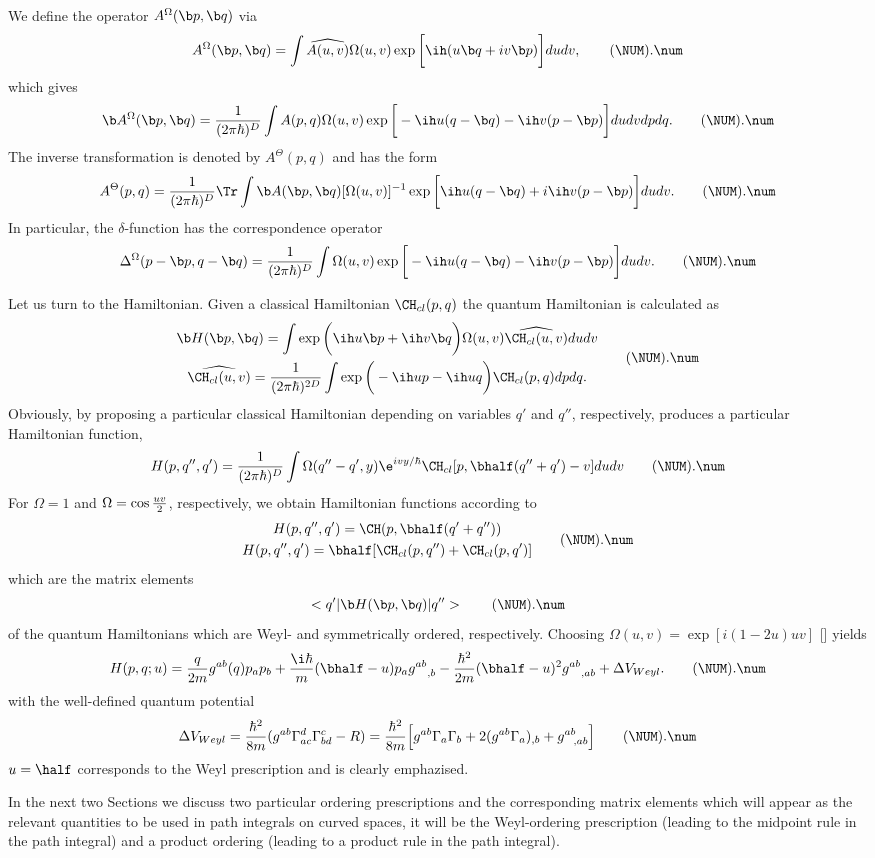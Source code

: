 We define the operator $A^\Omega(\b p,\b q)$ via
\plus
$$A^\Omega(\b p,\b q)=\int\widehat{A(u,v)}\Omega(u,v)
  \exp\bigg[\ih(u\b q+iv\b p)\bigg] dudv,
  \tag\NUM.\num$$
which gives
\plus
$$\b A^\Omega(\b p,\b q)
  ={1\over(2\pi\hbar)^D}\int A(p,q)\Omega(u,v)
  \exp\bigg[-\ih u(q-\b q)-\ih v(p-\b p)\bigg] dudvdpdq.
  \tag\NUM.\num$$
The inverse transformation is denoted by $A^\Theta(p,q)$ and has the
form
\plus
$$A^\Theta(p,q)={1\over(2\pi\hbar)^D}\Tr\int
  \b A(\b p,\b q)[\Omega(u,v)]^{-1}
  \exp\bigg[\ih u(q-\b q)+i\ih v(p-\b p)\bigg] dudv.
  \tag\NUM.\num$$
In particular, the $\delta$-function has the correspondence operator
\plus
$$\Delta^\Omega(p-\b p,q-\b q)
  ={1\over(2\pi\hbar)^D}\int\Omega(u,v)
  \exp\bigg[-\ih u(q-\b q)-\ih v(p-\b p)\bigg] dudv.
  \tag\NUM.\num$$

Let us turn to the Hamiltonian. Given a classical Hamiltonian
$\CH_{cl}(p,q)$ the quantum Hamiltonian is calculated as
\plus
$$\gathered
  \b H(\b p,\b q)=\int\exp\bigg(\ih u\b p+\ih v\b q\bigg)
  \Omega(u,v)\widehat{\CH_{cl}(u,v)}dudv
  \\
  \widehat{\CH_{cl}(u,v)}={1\over(2\pi\hbar)^{2D}}
  \int\exp\bigg(-\ih up-\ih uq\bigg)\CH_{cl}(p,q)dpdq.
  \endgathered
  \tag\NUM.\num$$
Obviously, by proposing a particular classical Hamiltonian depending on
variables $q'$ and $q''$, respectively, produces a particular
Hamiltonian function,
\plus
$$H(p,q'',q')={1\over(2\pi\hbar)^D}
  \int \Omega(q''-q',y)\e^{ivy/\hbar}\CH_{cl}[p,\bhalf(q''+q')-v]dudv
  \tag\NUM.\num$$
For  $\Omega=1$ and $\Omega=\cos{uv\over2}$, respectively,
we obtain Hamiltonian functions according to
\plus
$$\gathered
  H(p,q'',q')=\CH(p,\bhalf(q'+q''))
  \\
  H(p,q'',q')=\bhalf[\CH_{cl}(p,q'')+\CH_{cl}(p,q')]
  \endgathered
  \tag\NUM.\num$$
which are the matrix elements
\plus
$$<q'\vert\b H(\b p,\b q)\vert q''>
  \tag\NUM.\num$$
of the quantum Hamiltonians which are Weyl- and symmetrically
ordered, respectively. Choosing $\Omega(u,v)=\exp[i(1-2u)uv]$ [\HIR]
yields
\plus
$$H(p,q;u)
  ={q\over2m}g^{ab}(q)p_ap_b
   +{\i\hbar\over m}(\bhalf-u)p_a{g^{ab}}_{,b}
   -{\hbar^2\over2m}(\bhalf-u)^2{g^{ab}}_{,ab}+\Delta V_{Weyl}.
  \tag\NUM.\num$$
with the well-defined quantum potential
\plus
$$\Delta V_{Weyl}={\hbar^2\over8m}(g^{ab}\Gamma^d_{ac}\Gamma^c_{bd}-R)
      ={\hbar^2\over8m}\Big[g^{ab}\Gamma_a\Gamma_b
       +2(g^{ab}\Gamma_a)_{,b}+g^{ab}_{\ \ ,ab}\Big]
  \tag\NUM.\num$$
$u=\half$ corresponds to the Weyl prescription and is clearly
emphazised.

In the next two Sections we discuss two particular ordering
prescriptions and the corresponding matrix elements which will appear
as the relevant quantities to be used in path integrals on curved
spaces, it will be the Weyl-ordering prescription (leading to the
midpoint rule in  the path integral) and a product ordering (leading to
a product rule in the path integral).

